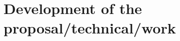 \documentclass[../main.tex]{subfiles}
\begin{document}
\chapter{Development of the proposal/technical/work} %
\label{cha:dvlp}

\end{document}
